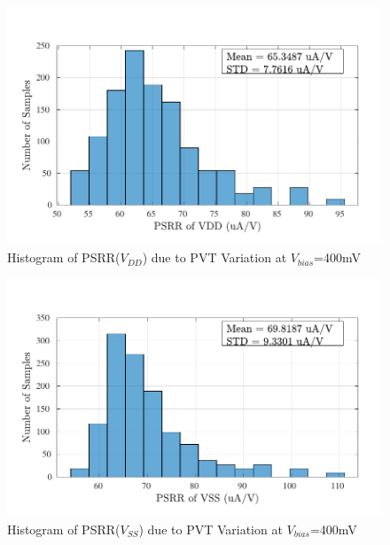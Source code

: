 \begin{figure} [H]
\centering
\includegraphics[scale=1]{Figures/Corners/Overall/PVT_Mid/PDFs/PVT_Mid_psrrp.pdf}
\caption{Histogram of PSRR($V_{DD}$) due to PVT Variation at $V_{bias}$=400mV}
\end{figure}

\begin{figure} [H]
\centering
\includegraphics[scale=1]{Figures/Corners/Overall/PVT_Mid/PDFs/PVT_Mid_psrrn.pdf}
\caption{Histogram of PSRR($V_{SS}$) due to PVT Variation at $V_{bias}$=400mV}
\end{figure}
